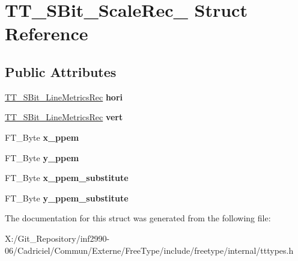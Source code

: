 \hypertarget{struct_t_t___s_bit___scale_rec__}{\section{T\-T\-\_\-\-S\-Bit\-\_\-\-Scale\-Rec\-\_\- Struct Reference}
\label{struct_t_t___s_bit___scale_rec__}
}
\subsection*{Public Attributes}
\begin{DoxyCompactItemize}
\item 
\hypertarget{struct_t_t___s_bit___scale_rec___a2a61bc97ebb7ed996170a03612ffbbc0}{\hyperlink{struct_t_t___s_bit___line_metrics_rec__}{T\-T\-\_\-\-S\-Bit\-\_\-\-Line\-Metrics\-Rec} {\bfseries hori}}\label{struct_t_t___s_bit___scale_rec___a2a61bc97ebb7ed996170a03612ffbbc0}

\item 
\hypertarget{struct_t_t___s_bit___scale_rec___acbf5c459602d9f52ac04a914e2f12375}{\hyperlink{struct_t_t___s_bit___line_metrics_rec__}{T\-T\-\_\-\-S\-Bit\-\_\-\-Line\-Metrics\-Rec} {\bfseries vert}}\label{struct_t_t___s_bit___scale_rec___acbf5c459602d9f52ac04a914e2f12375}

\item 
\hypertarget{struct_t_t___s_bit___scale_rec___a235731b0452ea063cccacd2f59b3f44c}{F\-T\-\_\-\-Byte {\bfseries x\-\_\-ppem}}\label{struct_t_t___s_bit___scale_rec___a235731b0452ea063cccacd2f59b3f44c}

\item 
\hypertarget{struct_t_t___s_bit___scale_rec___aa4c1fb419ea55c8c587ba81700c6ce66}{F\-T\-\_\-\-Byte {\bfseries y\-\_\-ppem}}\label{struct_t_t___s_bit___scale_rec___aa4c1fb419ea55c8c587ba81700c6ce66}

\item 
\hypertarget{struct_t_t___s_bit___scale_rec___a71955e363b0b5da84ed2c15d0e6f832d}{F\-T\-\_\-\-Byte {\bfseries x\-\_\-ppem\-\_\-substitute}}\label{struct_t_t___s_bit___scale_rec___a71955e363b0b5da84ed2c15d0e6f832d}

\item 
\hypertarget{struct_t_t___s_bit___scale_rec___a3a9f554d0153f9e3022898c1f59a7b63}{F\-T\-\_\-\-Byte {\bfseries y\-\_\-ppem\-\_\-substitute}}\label{struct_t_t___s_bit___scale_rec___a3a9f554d0153f9e3022898c1f59a7b63}

\end{DoxyCompactItemize}


The documentation for this struct was generated from the following file\-:\begin{DoxyCompactItemize}
\item 
X\-:/\-Git\-\_\-\-Repository/inf2990-\/06/\-Cadriciel/\-Commun/\-Externe/\-Free\-Type/include/freetype/internal/tttypes.\-h\end{DoxyCompactItemize}

